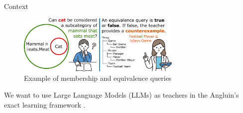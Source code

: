 \documentclass[handout]{beamer}\mode<handout>{\usetheme{AMSBolognaFC}}
\begin{document}
\begin{frame}[c]{Context}

    \begin{figure}
        \centering
        \includegraphics[width=0.7\textwidth]{figures/queries-example}
        \caption{Example of membership and equivalence queries}
        \label{}
    \end{figure}

    We want to use \alert{Large Language Models} (LLMs) as teachers in the \alert{Angluin}'s exact learning framework .

\end{frame}
\end{document}
